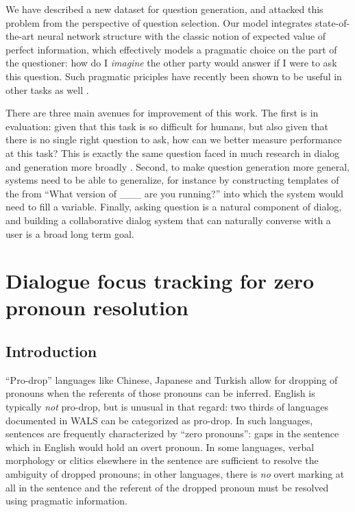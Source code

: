 \documentclass[11pt]{report}
\begin{document}
We have described a new dataset for question generation, and attacked this problem from the perspective of question selection.
Our model integrates state-of-the-art neural network structure with the classic notion of expected value of perfect information, which effectively models a pragmatic choice on the part of the questioner: how do I \emph{imagine} the other party would answer if I were to ask this question. Such pragmatic priciples have recently been shown to be useful in other tasks as well \cite{golland2010game,smith2013learning,orita2015discourse,andreas2016reasoning}.

There are three main avenues for improvement of this work.
The first is in evaluation: given that this task is so difficult for humans, but also given that there is no single right question to ask, how can we better measure performance at this task?
This is exactly the same question faced in much research in dialog and generation more broadly \cite{paek2001empirical,lowe2015ubuntu,liu2016not,kannan2017adversarial}.
Second, to make question generation more general, systems need to be able to generalize, for instance by constructing templates of the from ``What version of \_\_\_ are you running?'' into which the system would need to fill a variable. Finally, asking question is a natural component of dialog, and building a collaborative dialog system that can naturally converse with a user is a broad long term goal.

\newpage

\chapter{Dialogue focus tracking for zero pronoun resolution}\label{dialogue_focus_tracking}

\section{Introduction}

``Pro-drop'' languages like Chinese, Japanese and Turkish allow for dropping of pronouns when the referents of those pronouns can be inferred. English is typically 
\emph{not} pro-drop, but is unusual in that regard: two thirds of languages documented in WALS \cite{wals} can be categorized as pro-drop. In such languages, sentences are frequently characterized by ``zero pronouns'': gaps in the sentence which in English would hold an overt pronoun. In some languages, verbal morphology or clitics elsewhere in the sentence are sufficient to resolve the ambiguity of dropped pronouns; in other languages, there is \emph{no} overt marking at all in the sentence and the referent of the dropped pronoun must be resolved using pragmatic information.
\end{document}
